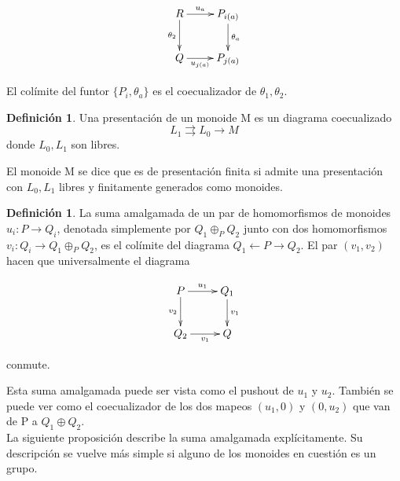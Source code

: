 \documentclass[12pt,spanish]{amsart}
\newcommand{\sqrd}[8]{
 \xymatrix{%
 {#1} \ar[r]^-{#5}\ar[d]_-{#8} & {#2}\ar[d]^-{#6} \\ %
 {#4}\ar[r]_-{#7} & {#3} %
 }%
 } %
\theoremstyle{definition}
\newtheorem{Def}[Theorem]{Definición}
\theoremstyle{remark}
\begin{document}
$$\sqrd{R}{P_{i(a)}}{P_{j(a)}}{Q}{u_{a}}{\theta_{a}}{u_{j(a)}}{\theta_{2}}$$

El colímite del funtor $\{P_{i},\theta_{a}\}$ es el coecualizador de $\theta_{1},\theta_{2}$. \\

\begin{Def}
Una presentación de un monoide M es un diagrama coecualizado
$$L_{1} \rightrightarrows L_{0} \rightarrow M$$
donde $L_{0},L_{1}$ son libres.
\end{Def}

El monoide M se dice que es de presentación finita si admite una presentación con $L_{0},L_{1}$ libres y finitamente generados como monoides. \\

\begin{Def}
La suma amalgamada de un par de homomorfismos de monoides $u_{i}:P \to Q_{i}$, denotada simplemente por $Q_{1}\oplus_{P}Q_{2}$ junto con dos homomorfismos $v_{i}:Q_{i} \to Q_{1}\oplus_{P}Q_{2}$, es el colímite del diagrama $Q_{1}\leftarrow P \rightarrow Q_{2}$. El par $(v_{1},v_{2})$ hacen que universalmente el diagrama 

$$\sqrd{P}{Q_{1}}{Q}{Q_{2}}{u_{1}}{v_{1}}{v_{1}}{v_{2}}$$

conmute.
\end{Def}

Esta suma amalgamada puede ser vista como el pushout de $u_{1}$ y $u_{2}$. También se puede ver como el coecualizador de los dos mapeos $(u_{1},0)$ y $(0,u_{2})$ que van de P a $Q_{1}\oplus Q_{2}$. \\
La siguiente proposición describe la suma amalgamada explícitamente. Su descripción se vuelve más simple si alguno de los monoides en cuestión es un grupo.  \\
\end{document}
